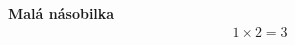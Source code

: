 \renewcommand{\thesection}{A.\arabic{section}}
\renewcommand{\theequation}{A.\arabic{equation}}
\renewcommand{\thefigure}{A.\arabic{figure}}
\setcounter{equation}{0}

\textbf{Malá násobilka}
  \hspace{15pt}
  \begin{align}
      1\times2 = 3
  \end{align}
